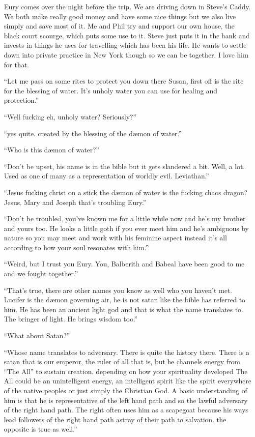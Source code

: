 Eury comes over the night before the trip. We are driving down in Steve's Caddy. We both make really good money and have some nice things but we also live simply and save most of it. Me and Phil try and support our own house, the black court scourge, which puts some use to it. Steve just puts it in the bank and invests in things he uses for travelling which has been his life. He wants to settle down into private practice in New York though so we can be together. I love him for that.

``Let me pass on some rites to protect you down there Susan, first off is the rite for the blessing of water. It's unholy water you can use for healing and protection.''

``Well fucking eh, unholy water? Seriously?''

``yes quite. created by the blessing of the d\ae mon of water.''

``Who is this d\ae mon of water?''

``Don't be upset, his name is in the bible but it gets slandered a bit. Well, a lot. Used as one of many as a representation of worldly evil. Leviathan.''

``Jesus fucking christ on a stick the d\ae mon of water is the fucking chaos dragon? Jesus, Mary and Joseph that's troubling Eury.''

``Don't be troubled, you've known me for a little while now and he's my brother and yours too. He looks a little goth if you ever meet him and he's ambiguous by nature so you may meet and work with his feminine aspect instead it's all according to how your soul resonates with him.''

``Weird, but I trust you Eury. You, Balberith and Babeal have been good to me and we fought together.''

``That's true, there are other names you know as well who you haven't met. Lucifer is the d\ae mon governing air, he is not satan like the bible has referred to him. He has been an ancient light god and that is what the name translates to. The bringer of light. He brings wisdom too.''

``What about Satan?''

``Whose name translates to adversary. There is quite the history there. There is a satan that is our emperor, the ruler of all that is, but he channels energy from ``The All'' to sustain creation. depending on how your spirituality developed The All could be an unintelligent energy, an intelligent spirit like the spirit everywhere of the native peoples or just simply the Christian God. A basic understanding of him is that he is representative of the left hand path and so the lawful adversary of the right hand path. The right often uses him as a scapegoat because his ways lead followers of the right hand path astray of their path to salvation. the opposite is true as well.''


